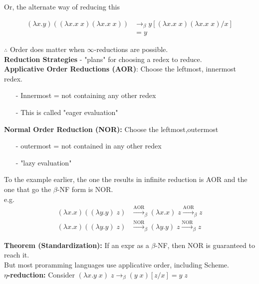 \documentclass[11pt]{article}
\begin{document}
Or, the alternate way of reducing this

\begin{align*}
(\lambda x.y)((\lambda x.x\;x)(\lambda x.x\;x)) &\rightarrow_\beta y[(\lambda x.x\;x)(\lambda x.x\;x)/x] \\
&= y
\end{align*}

$\therefore$ Order does matter when $\infty$-reductions are possible. \\

{\bf Reduction Strategies} - "plans" for choosing a redex to reduce. \\

{\bf Applicative Order Reductions (AOR)}: Choose the leftmost, innermost redex. 
\begin{itemize}
	\item[-] Innermost = not containing any other redex 
	\item[-] This is called "eager evaluation" 
\end{itemize}

{\bf Normal Order Reduction (NOR):} Choose the leftmost,outermost
\begin{itemize}
	\item[-] outermost = not contained in any other redex
	\item[-] "lazy evaluation"
\end{itemize}

To the example earlier, the one the results in infinite reduction is AOR and the one that go the $\beta$-NF form is NOR. \\

e.g. 
\begin{align*}
(\lambda x.x)((\lambda y.y)\;z) &\xrightarrow{\text{AOR}}_\beta (\lambda x.x)\;z \xrightarrow{\text{AOR}}_\beta z \\
(\lambda x.x)((\lambda y.y)\;z) &\xrightarrow{\text{NOR}}_\beta (\lambda y.y)\;z \xrightarrow{\text{NOR}}_\beta z
\end{align*}

{\bf Theorem (Standardization):} If an expr as a $\beta$-NF, then NOR is guaranteed to reach it. \\

But most proramming languages use applicative order, including Scheme. \\

{\bf $\eta$-reduction:} Consider $(\lambda x.y\;x)\;z \rightarrow_\beta (y\;x)[z/x] = y\;z$ \\
\end{document}
